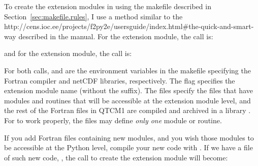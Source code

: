 To create the extension modules in  using
the makefile described in Section~\ref{sec:makefile.rules},
I use a method similar to the
%
{%
{http://cens.ioc.ee/projects/f2py2e/usersguide/index.html#the-quick-and-smart-way}}
described in the  manual.
For the  extension module, the 
 call is:

\begin{codeblock}
\end{codeblock}

and for the  extension module, the call is:

\begin{codeblock}
\end{codeblock}

For both calls,  and  are the environment
variables in the makefile specifying the Fortran compiler and netCDF
libraries, respectively.  The  flag specifies the extension
module name (without the  suffix).  The  files
specify the files that have modules and routines that will be
accessible at the extension module level, and the rest of the Fortran
files in QTCM1 are compiled and archived in a library .
For  to work properly,
the  files may define \emph{only one} module or routine.

If you add Fortran files containing new modules, and you wish those
modules to be accessible at the Python level, compile your new code
with .  If we have a file of such new code, ,
the  call to create the 
extension module will become:

\begin{codeblock}
\end{codeblock}

